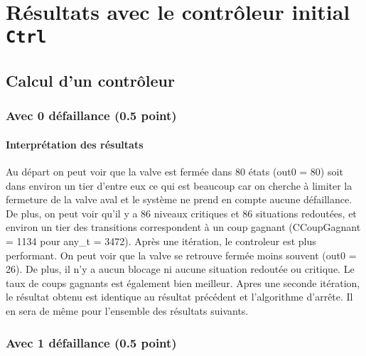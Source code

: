 \documentclass[a4paper]{book}
\begin{document}
\section{Résultats avec le contrôleur initial {\tt Ctrl}}
\subsection{Calcul d'un contrôleur}
\subsubsection{Avec 0 défaillance (0.5 point)}



%
%
\paragraph{Interprétation des résultats}
Au départ on peut voir que la valve est fermée dans 80 états (out0 = 80) 
soit dans environ un tier d'entre eux ce qui est beaucoup car on cherche à limiter la fermeture de la valve aval et le système ne prend en compte aucune défaillance. 
De plus, on peut voir qu'il y a 86 niveaux critiques et 86 situations redoutées, et environ un tier des transitions correspondent à un coup gagnant (CCoupGagnant = 1134 pour any\_t = 3472).
Après une itération, le controleur est plus performant. On peut voir que la valve se retrouve fermée moins souvent (out0 = 26). De plus, il n'y a aucun blocage 
ni aucune situation redoutée ou critique. Le taux de coups gagnants est également bien meilleur.
Apres une seconde itération, le résultat obtenu est identique au résultat précédent et l'algorithme d'arrête. Il en sera de même pour l'ensemble des résultats suivants.


\subsubsection{Avec 1 défaillance (0.5 point)}




%
\end{document}
